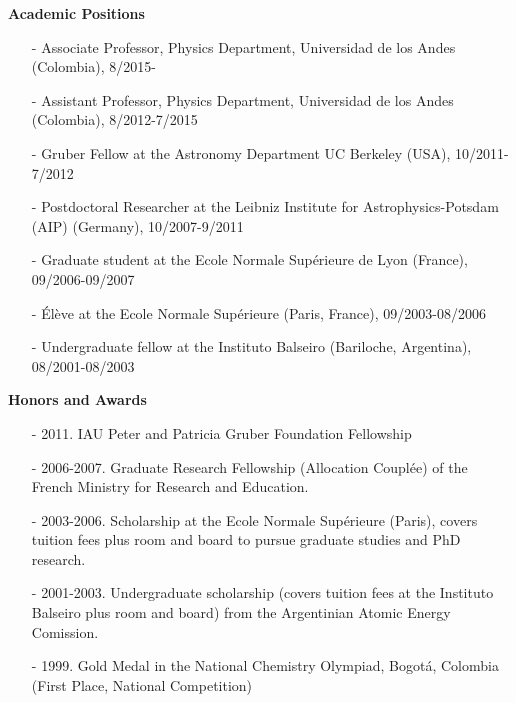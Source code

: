 \documentclass[letterpaper,11pt,onecolumn]{article}
\begin{document}
{\bf Academic Positions}
\begin{itemize}
\item[-] Associate Professor, Physics Department, Universidad de los Andes (Colombia), 8/2015-
\item[-] Assistant Professor, Physics Department, Universidad de los Andes (Colombia), 8/2012-7/2015
\item[-] Gruber Fellow at the Astronomy Department UC Berkeley (USA), 10/2011-7/2012
\item[-] Postdoctoral Researcher at the Leibniz Institute for
  Astrophysics-Potsdam (AIP) (Germany), 10/2007-9/2011  
\item[-] Graduate student at the Ecole Normale Sup\'erieure de Lyon
  (France), 09/2006-09/2007  
\item[-] \'El\`eve at the Ecole Normale Sup\'erieure (Paris, France),
  09/2003-08/2006 
\item[-] Undergraduate fellow at the Instituto Balseiro (Bariloche,
  Argentina), 08/2001-08/2003 
\end{itemize}

\newpage
{\bf Honors and Awards}
\begin{itemize}
\item[-] 2011. IAU Peter and Patricia Gruber Foundation Fellowship
\item[-] 2006-2007. Graduate Research Fellowship (Allocation Coupl\'ee) of the French
  Ministry for Research and Education.
\item[-] 2003-2006. Scholarship at the Ecole Normale Sup\'erieure (Paris), covers tuition fees plus room and
  board to pursue graduate studies and PhD research.
\item[-] 2001-2003. Undergraduate scholarship (covers tuition fees at the
  Instituto Balseiro plus room and board) from the Argentinian Atomic Energy
  Comission.
\item[-] 1999. Gold Medal in the National Chemistry Olympiad, Bogot\'a,
  Colombia (First Place, National Competition)
\end{itemize}
\end{document}
